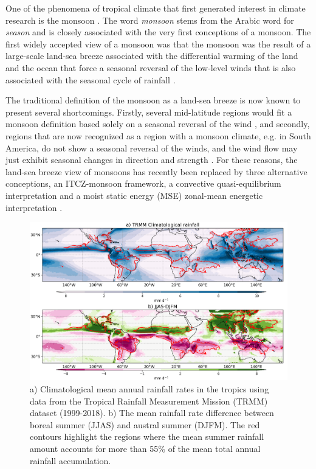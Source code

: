 One of the phenomena of tropical climate that first generated interest in climate research is the monsoon \citep{halley}. The word \textit{monsoon} stems from the Arabic word for \textit{season} and is closely associated with the very first conceptions of a monsoon. 
The first widely accepted view of a monsoon was that the monsoon was the result of a large-scale land-sea breeze associated with the differential warming of the land and the ocean that force a seasonal reversal of the low-level winds that is also associated with the seasonal cycle of rainfall \citep{halley}. 

The traditional definition of the monsoon as a land-sea breeze is now known to present several shortcomings. Firstly, several mid-latitude regions would fit a monsoon definition based solely on a seasonal reversal of the wind \citep{gadgil2018}, and secondly, regions that are now recognized as a region with a monsoon climate, e.g. in South America, do not show a seasonal reversal of the winds, and the wind flow may just exhibit seasonal changes in direction and strength \citep{vera2006}. For these reasons, the land-sea breeze view of monsoons has recently been replaced by three alternative conceptions, an ITCZ-monsoon framework, a convective quasi-equilibrium interpretation and a moist static energy (MSE) zonal-mean energetic interpretation \citep{biasutti2018global,hill2019,geen2020}. 

\begin{figure}[b!]
\includegraphics[width=\linewidth]{figures/trmmclima.png}
\caption[The global monsoon rainfall]{a) Climatological mean annual rainfall rates in the tropics using data from the Tropical Rainfall Measurement Mission (TRMM) dataset (1999-2018). b) The mean rainfall rate difference between boreal summer (JJAS) and austral summer (DJFM). The red contours highlight the regions where the mean summer rainfall amount accounts for more than 55\% of the mean total annual rainfall accumulation. }
\label{fig:monsoon}
\end{figure}


